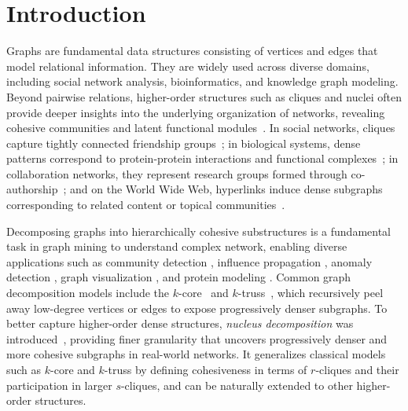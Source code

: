 \section{Introduction} \label{sec:introduction}


Graphs are fundamental data structures consisting of vertices and edges that model relational information. They are widely used across diverse domains, including social network analysis, bioinformatics, and knowledge graph modeling.
%
Beyond pairwise relations, higher-order structures such as cliques and nuclei often provide deeper insights into the underlying organization of networks, revealing cohesive communities and latent functional modules~\cite{luo2019higher,rossetti2019community}.
%
In social networks, cliques capture tightly connected friendship groups~\cite{leskovec2016snap,ugander2018structural}; in biological systems, dense patterns correspond to protein-protein interactions and functional complexes~\cite{luo2019higher}; in collaboration networks, they represent research groups formed through co-authorship~\cite{xia2017measuring,chen2019linking}; and on the World Wide Web, hyperlinks induce dense subgraphs corresponding to related content or topical communities~\cite{malliaros2013clustering,gibson1998inferring}.


Decomposing graphs into hierarchically cohesive substructures is a fundamental task in graph mining to understand complex network, enabling diverse applications such as community detection \cite{girvan2002community}, influence propagation \cite{kempe2003maximizing}, anomaly detection \cite{akoglu2015graph}, graph visualization \cite{huang2014graph}, and protein modeling \cite{sharan2006modeling}.
%
Common graph decomposition models include the $k$-core~\cite{malliaros2020core2,batagelj2011fast} and $k$-truss~\cite{huang2014triangle,zhu2021efficient}, which recursively peel away low-degree vertices or edges to expose progressively denser subgraphs.
% 
To better capture higher-order dense structures, \textit{nucleus decomposition} was introduced~\cite{firstNucleus}, providing finer granularity that uncovers progressively denser and more cohesive subgraphs in real-world networks.
%
It generalizes classical models such as $k$-core and $k$-truss by defining cohesiveness in terms of $r$-cliques and their participation in larger $s$-cliques, and can be naturally extended to other higher-order structures.


